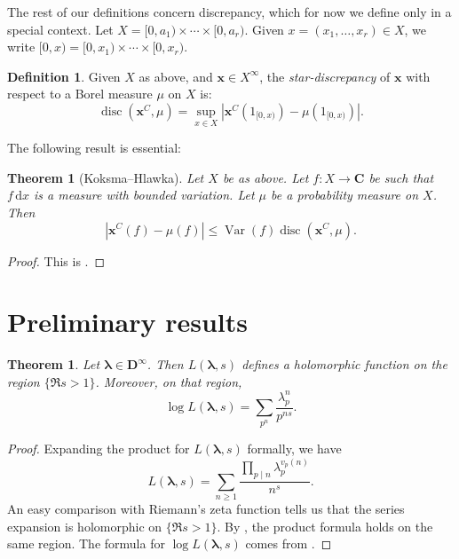\documentclass{article}
\DeclareMathOperator{\disc}{disc}
\DeclareMathOperator{\Var}{Var}
\newcommand{\bC}{\mathbf{C}}
\newcommand{\bD}{\mathbf{D}}
\newcommand{\blambda}{{\boldsymbol{\lambda}}}
\newcommand{\bx}{\boldsymbol{x}}
\newcommand{\dd}{\mathrm{d}}
\newtheorem{theorem}[subsection]{Theorem}
\theoremstyle{definition}
\newtheorem{definition}[subsection]{Definition}
\begin{document}
The rest of our definitions concern discrepancy, which for now we define only 
in a special context. Let $X=[0,a_1)\times \cdots \times [0,a_r)$. Given 
$x=(x_1,\dots,x_r)\in X$, we write $[0,x)=[0,x_1)\times \cdots \times [0,x_r)$. 

\begin{definition}
Given $X$ as above, and $\bx\in X^\infty$, the \emph{star-discrepancy} of $\bx$ 
with respect to a Borel measure $\mu$ on $X$ is:
\[
	\disc(\bx^C,\mu) = \sup_{x\in X} \left|\bx^C(1_{[0,x)}) - \mu(1_{[0,x)})\right| .
\]
\end{definition}

The following result is essential:

\begin{theorem}[Koksma--Hlawka]
Let $X$ be as above. Let $f\colon X\to \bC$ be such that $f\, \dd x$ is a 
measure with bounded variation. Let $\mu$ be a probability measure on $X$. Then 
\[
	|\bx^C(f) - \mu(f)| \leqslant \Var(f) \disc(\bx^C,\mu) .
\]
\end{theorem}
\begin{proof}
This is \cite[Th.~3.2]{okten-1999}. 
\end{proof}





\section{Preliminary results}\label{sec:prelim-result}

\begin{theorem}
Let $\blambda\in \bD^\infty$. Then $L(\blambda,s)$ defines a holomorphic 
function on the region $\{\Re s>1\}$. Moreover, on that region, 
\[
	\log L(\blambda,s) = \sum_{p^n} \frac{\lambda_p^n}{p^{n s}} .
\]
\end{theorem}
\begin{proof}
Expanding the product for $L(\blambda,s)$ formally, we have 
\[
	L(\blambda,s) = \sum_{n\geqslant 1} \frac{\prod_{p\mid n} \lambda_p^{v_p(n)}}{n^s} .
\]
An easy comparison with Riemann's zeta function tells us that the series 
expansion is holomorphic on $\{\Re s>1\}$. By \cite[Th.~11.7]{apostol-1976}, 
the product formula holds on the same region. The formula for 
$\log L(\blambda,s)$ comes from \cite[11.9 Ex.~2]{apostol-1976}.
\end{proof}
\end{document}
